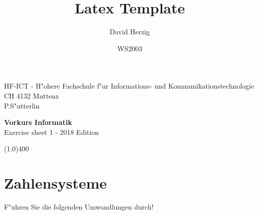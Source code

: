 \documentclass[a4paper,10pt]{article}
\title{Latex Template}
\author{David Herzig}
\date{WS2003}
\begin{document}
HF-ICT - H"ohere Fachschule f"ur Informations- und Kommunikationstechnologie\\
CH 4132 Muttenz\\
P.S"utterlin

\vspace{2mm}

\begin{center}
{\Large \bf Vorkurs Informatik}\\
Exercise sheet 1 - 2018 Edition
\end{center}

\vspace{2mm}

\line(1,0){400}

\vspace{5mm}

\section{Zahlensysteme}

F"uhren Sie die folgenden Umwandlungen durch!
\end{document}
